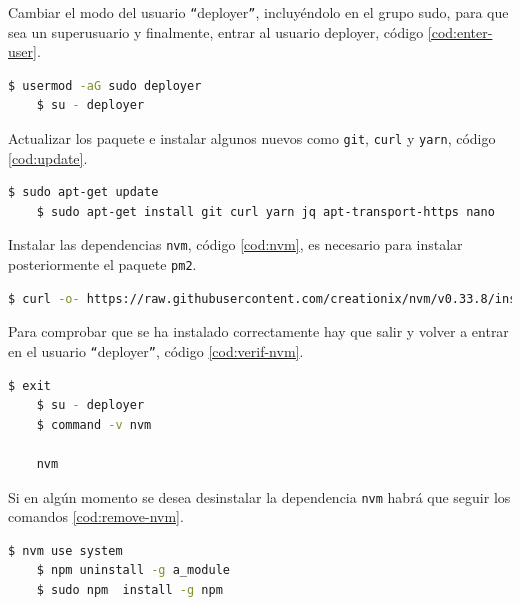 Cambiar el modo del usuario \texttt{``{}}deployer\texttt{''}, incluyéndolo en el grupo sudo, para que sea un superusuario y finalmente, entrar al usuario deployer, código \ref{cod:enter-user}.\\

\begin{lstlisting}[language=Bash,caption=Instalación \textit{blockchain}. Parte III, label=cod:enter-user, style=Consola]
	$ usermod -aG sudo deployer
	$ su - deployer
\end{lstlisting}

Actualizar los paquete e instalar algunos nuevos como \texttt{git}, \texttt{curl} y \texttt{yarn}, código \ref{cod:update}.\\

\begin{lstlisting}[language=Bash,caption=Instalación \textit{blockchain}. Parte IV, label=cod:update, style=Consola]
	$ sudo apt-get update
	$ sudo apt-get install git curl yarn jq apt-transport-https nano
\end{lstlisting}

Instalar las dependencias \texttt{nvm}, código \ref{cod:nvm}, es necesario para instalar posteriormente el paquete \texttt{pm2}.\\

\begin{lstlisting}[language=Bash,caption=Instalación \textit{blockchain}. Parte V, label=cod:nvm, style=Consola]
	$ curl -o- https://raw.githubusercontent.com/creationix/nvm/v0.33.8/install.sh | bash
\end{lstlisting}

Para comprobar que se ha instalado correctamente hay que salir y volver a entrar en el usuario \texttt{``{}}deployer\texttt{''}, código \ref{cod:verif-nvm}.\\

\begin{lstlisting}[language=Bash,caption=Instalación \textit{blockchain}. Parte VI, label=cod:verif-nvm, style=Consola]
	$ exit
	$ su - deployer
	$ command -v nvm

	nvm
\end{lstlisting}

Si en algún momento se desea desinstalar la dependencia \texttt{nvm} habrá que seguir los comandos \ref{cod:remove-nvm}.

\begin{lstlisting}[language=Bash,caption=Instalación \textit{blockchain}. Parte VII, label=cod:remove-nvm, style=Consola]
	$ nvm use system
	$ npm uninstall -g a_module
	$ sudo npm  install -g npm
\end{lstlisting}

